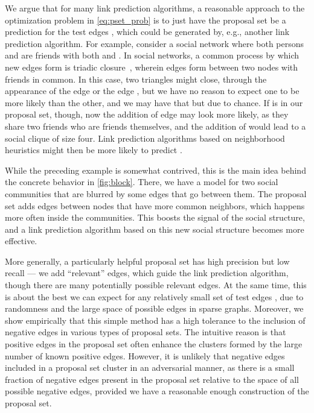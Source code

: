 \documentclass{article}
\newcommand{\xhdr}[1]{\vspace{1.0mm}\noindent{\textbf{#1.}}\hspace{1mm}}
\begin{document}
\xhdr{Proposal set construction by approximating the test set}
We argue that for many link prediction algorithms, a reasonable approach to the optimization problem in \eqref{eq:pset_prob}
is to just have the proposal set  be a prediction for the test edges , which could be generated by, e.g., another link prediction algorithm.
For example, consider a social network where both persons  and  are friends with both  and .
In social networks, a common process by which new edges form is triadic closure~\cite{easley2010networks}, wherein edges form between two nodes with friends in common.
In this case, two triangles might close, through the appearance of the edge  or the edge ,
but we have no reason to expect one to be more likely than the other, and we may have that  but 
due to chance.
If  is in our proposal set, though, now the addition of edge  may look more likely, as they share two friends who are friends themselves, and the addition of  would lead to a social clique of size four.
Link prediction algorithms based on neighborhood heuristics might then be more likely to predict .


While the preceding example is somewhat contrived, this is the main idea behind the concrete behavior in \cref{fig:block}.
There, we have a model for two social communities that are blurred by some edges that go between them.
The proposal set adds edges between nodes that have more common neighbors, which happens more often inside the communities.
This boosts the signal of the social structure, and a link prediction algorithm based on this new social structure becomes more effective.

More generally, a particularly helpful proposal set has high precision but low recall --- we add ``relevant'' edges, which guide the link prediction algorithm, though there are many potentially possible relevant edges.
At the same time, this is about the best we can expect for any relatively small set of test edges ,
due to randomness and the large space of possible edges in sparse graphs.
Moreover, we show empirically that this simple method has a high tolerance to the inclusion of negative edges in various types of proposal sets.
The intuitive reason is that positive edges in the proposal set often enhance the clusters formed by the large number of known positive edges. However, it is unlikely that negative edges included in a proposal set cluster in an adversarial manner, as there is a small fraction of negative edges present in the proposal set relative to the space of all possible negative edges, provided we have a reasonable enough construction of the proposal set.
\end{document}
